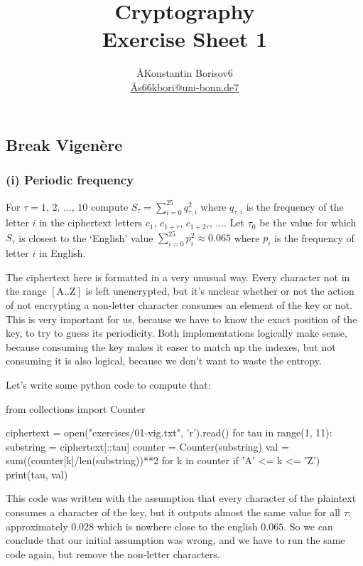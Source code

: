 \documentclass{article}
\title{Cryptography \\ Exercise Sheet 1}
\author{
  \AA{Konstantin Borisov}{6} \\
  \href{mailto:\AA{s66kbori@uni-bonn.de}{7}}{\AA{s66kbori@uni-bonn.de}{7}}
}
\begin{document}
  \maketitle

  \setcounter{section}{1}
  \subsection{Break Vigenère}
  \subsubsection*{(i) Periodic frequency}
  \begin{centerframebox}
    For $\tau = 1,\, 2,\, \dots,\, 10$ compute $S_\tau = \sum_{i=0}^{25} q^2_{\tau,i}$
    where $q_{\tau,i}$ is the frequency of the letter $i$ in the ciphertext letters $c_1,\, c_{1+\tau},\, c_{1+2\tau},\, \dots$.
    Let $\tau_0$ be the value for which $S_\tau$ is closest to the `English' value $\sum_{i=0}^{25} p_i^2 \approx 0.065$
    where $p_i$ is the frequency of letter $i$ in English.
  \end{centerframebox}
  The ciphertext here is formatted in a very unusual way.
  Every character not in the range $[\text{A} .. \text{Z}]$ is left unencrypted,
  but it's unclear whether or not the action of not encrypting a non-letter character consumes an element of the key or not.
  This is very important for us, because we have to know the exact position of the key, to try to guess its periodicity.
  Both implementations logically make sense, because consuming the key makes it easer to match up the indexes,
  but not consuming it is also logical, because we don't want to waste the entropy.

  Let's write some python code to compute that:
  \begin{mylisting}
    from collections import Counter

    ciphertext = open("exercises/01-vig.txt", 'r').read()
    for tau in range(1, 11):
      substring = ciphertext[::tau]
      counter = Counter(substring)
      val = sum((counter[k]/len(substring))**2 for k in counter if 'A' <= k <= 'Z')
      print(tau, val)
  \end{mylisting}
  This code was written with the assumption that every character of the plaintext consumes a character of the key,
  but it outputs almost the same value for all $\tau$: approximately $0.028$ which is nowhere close to the english $0.065$.
  So we can conclude that our initial assumption was wrong, and we have to run the same code again, but remove the non-letter characters.
\end{document}
